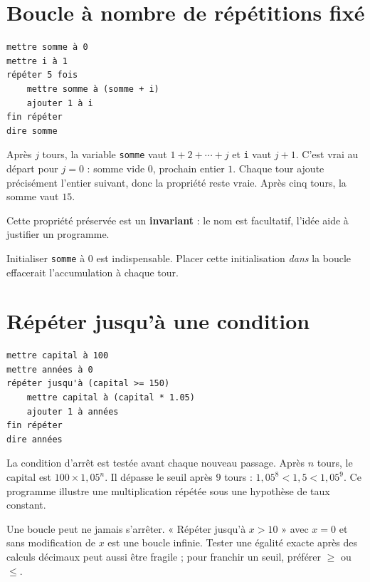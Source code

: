\documentclass[../cours_3e.tex]{subfiles}
\begin{document}
\section{Boucle à nombre de répétitions fixé}
\begin{lstlisting}
mettre somme à 0
mettre i à 1
répéter 5 fois
    mettre somme à (somme + i)
    ajouter 1 à i
fin répéter
dire somme
\end{lstlisting}
\begin{demonstration}
Après $j$ tours, la variable \texttt{somme} vaut $1+2+\cdots+j$ et \texttt{i} vaut $j+1$. C'est vrai au départ pour $j=0$ : somme vide $0$, prochain entier $1$. Chaque tour ajoute précisément l'entier suivant, donc la propriété reste vraie. Après cinq tours, la somme vaut $15$.
\end{demonstration}
Cette propriété préservée est un \textbf{invariant} : le nom est facultatif, l'idée aide à justifier un programme.
\begin{attention}
Initialiser \texttt{somme} à $0$ est indispensable. Placer cette initialisation \emph{dans} la boucle effacerait l'accumulation à chaque tour.
\end{attention}
\section{Répéter jusqu'à une condition}
\begin{lstlisting}
mettre capital à 100
mettre années à 0
répéter jusqu'à (capital >= 150)
    mettre capital à (capital * 1.05)
    ajouter 1 à années
fin répéter
dire années
\end{lstlisting}
La condition d'arrêt est testée avant chaque nouveau passage. Après $n$ tours, le capital est $100\times1{,}05^n$. Il dépasse le seuil après $9$ tours : $1{,}05^8<1{,}5<1{,}05^9$.
Ce programme illustre une multiplication répétée sous une hypothèse de taux constant.
\begin{attention}
Une boucle peut ne jamais s'arrêter. « Répéter jusqu'à $x>10$ » avec $x=0$ et sans modification de $x$ est une boucle infinie. Tester une égalité exacte après des calculs décimaux peut aussi être fragile ; pour franchir un seuil, préférer $\geq$ ou $\leq$.
\end{attention}
\end{document}
